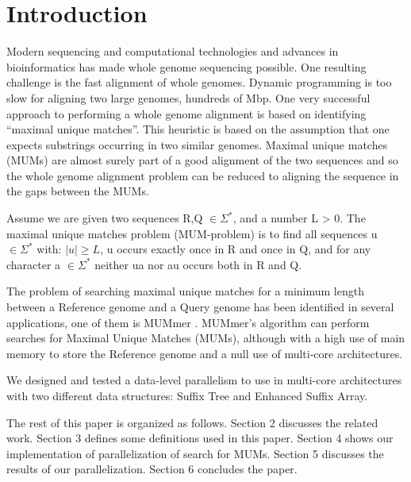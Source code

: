 \documentclass[runningheads,a5paper]{llncs}
\begin{document}
\section{Introduction} 
Modern sequencing and computational technologies and advances in bioinformatics has made whole genome sequencing possible. One resulting challenge is the fast alignment of whole genomes. Dynamic programming is too slow for aligning two large genomes, hundreds of Mbp. One very successful approach to performing a whole genome alignment is based on identifying ``maximal unique matches''. This heuristic is based on the assumption that one expects substrings occurring in two similar genomes. Maximal unique matches (MUMs) are almost surely part of a good alignment of the two sequences and so the whole genome alignment problem can be reduced to aligning the sequence in the gaps between the MUMs.
\begin{definition}
Assume we are given two sequences R,Q $\in \Sigma^*$, and a number L > 0. The maximal unique matches problem (MUM-problem) is to find all sequences u $\in \Sigma^*$ with: $|u|\geq L$, u occurs exactly once in R and once in Q, and for any character a $\in \Sigma^*$ neither ua nor au occurs both in R and Q.
\end{definition}
The problem of searching maximal unique matches for a minimum length between a Reference genome and a Query genome has been identified in several applications, one of them is MUMmer \cite{Delcher2003}. MUMmer's algorithm can perform searches for Maximal Unique Matches (MUMs), although with a high use of main memory to store the Reference genome and a null use of multi-core architectures.

We designed and tested a data-level parallelism to use in multi-core architectures with two different data structures: Suffix Tree and Enhanced Suffix Array.

The rest of this paper is organized as follows. Section 2 discusses the related work. Section 3 defines some definitions used in this paper. Section 4 shows our implementation of parallelization of search for MUMs. Section 5 discusses the results of our parallelization. Section 6 concludes the paper.
\end{document}
